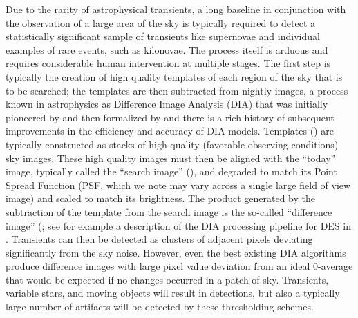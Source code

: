 Due to the rarity of astrophysical transients, a long baseline in conjunction with the observation of a large area of the sky is typically required to detect a statistically significant sample of transients like supernovae and individual examples of rare events, such as kilonovae.  The process itself is arduous and requires considerable human intervention at multiple stages. The first step is typically the creation of high quality templates of each region of the sky that is to be searched; the templates are then subtracted from nightly images, a process known in astrophysics as Difference Image Analysis (DIA) that was initially pioneered by \cite{Tomaney_1996} and then formalized by \cite{Alard_1998} and there is a rich history of subsequent improvements in the efficiency and accuracy of DIA models. Templates  (\temp) are typically constructed as stacks of high quality (favorable observing conditions) sky images. These high quality images must then be aligned with the ``today'' image, typically called the ``search image'' (\search), and degraded to match its Point Spread Function (PSF, which we note may vary across a single large field of view image) and scaled to match its brightness. The product generated by the subtraction of the template from the search image is the so-called ``difference image''   (\diff; see for example a description of the DIA processing pipeline for DES in \citealt{Kessler_2015}.
Transients can then be detected as clusters of adjacent pixels deviating significantly from the sky noise.
However, even the best existing DIA algorithms produce difference images with large pixel value deviation from an ideal 0-average that would be expected if no changes occurred in a patch of sky. Transients, variable stars, and moving objects will result in detections, but also a typically large number of artifacts will be detected by these thresholding schemes.

